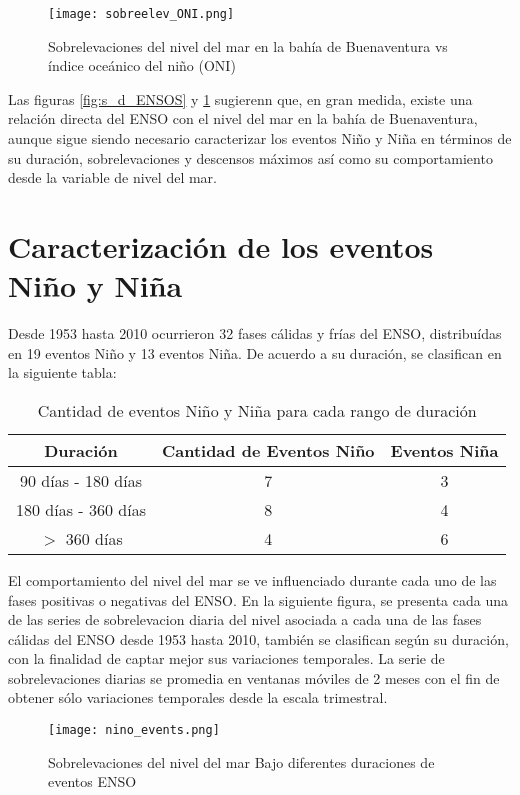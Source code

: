 \begin{figure}[H]
	\centering
	\texttt{[image: sobreelev\_ONI.png]}
	\caption{Sobrelevaciones del nivel del mar en la bahía de Buenaventura vs índice oceánico del niño (ONI) }
	\label{fig:sobrelevaciones vs oni}
\end{figure}

Las figuras \ref{fig:s_d_ENSOS} y \ref{fig:sobrelevaciones vs oni} sugierenn que, en gran medida, existe una relación directa del ENSO con el nivel del mar en la bahía de Buenaventura, aunque sigue siendo necesario caracterizar los eventos Niño y Niña en términos de su duración, sobrelevaciones y descensos máximos así como su comportamiento desde la variable de nivel del mar.

\section{Caracterización de los eventos Niño y Niña}
Desde 1953 hasta 2010 ocurrieron 32 fases cálidas y frías del ENSO, distribuídas en 19 eventos Niño y 13 eventos Niña. De acuerdo a su duración, se clasifican en la siguiente tabla:

\begin{table}[H]
	\centering
	\begin{tabular}{|c|c|c|}
		\hline
		Duración & Cantidad de Eventos Niño&Eventos Niña\\
		\hline
		90 días - 180 días & 7&3\\
		\hline
		180 días - 360 días & 8&4\\
		\hline 
		$>$ 360 días & 4&6\\
		\hline
	\end{tabular}
	\caption{Cantidad de eventos Niño y Niña para cada rango de duración}
	\label{table:eventos_niñ@}
\end{table}

El comportamiento del nivel del mar se ve influenciado durante cada uno de las fases positivas o negativas del ENSO. En la siguiente figura, se presenta cada una de las series de sobrelevacion diaria del nivel asociada a cada una de las fases cálidas del ENSO desde 1953 hasta 2010, también se clasifican según su duración, con la finalidad de captar mejor sus variaciones temporales. La serie de sobrelevaciones diarias se promedia en ventanas móviles de 2 meses con el fin de obtener sólo variaciones temporales desde la escala trimestral.

\begin{figure}[H]
	\centering
	\texttt{[image: nino\_events.png]}
	\caption{Sobrelevaciones del nivel del mar Bajo diferentes duraciones de eventos ENSO}
	\label{fig:nino_events}
\end{figure}

